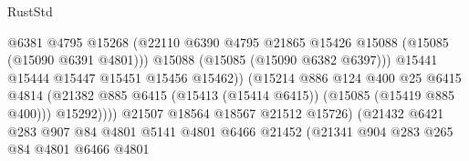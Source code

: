 \begin{lexlean}{RustStd}
\begin{coremodule}
                                              @6381
                                              @4795
                                              @15268
                                              (@22110
                                                @6390
                                                @4795
                                                @21865
                                                @15426
                                                @15088
                                                (@15085 (@15090 @6391 @4801)))
                                              @15088
                                              (@15085 (@15090 @6382 @6397)))
                                            @15441
                                            @15444
                                            @15447
                                            @15451
                                            @15456
                                            @15462))
                                        (@15214
                                          @886
                                          @124
                                          @400
                                          @25
                                          @6415
                                          @4814
                                          (@21382
                                            @885
                                            @6415
                                            (@15413 (@15414 @6415))
                                            (@15085 (@15419 @885 @400)))
                                          @15292))))
                                  @21507
                                  @18564
                                  @18567
                                  @21512
                                  @15726)
                                (@21432
                                  @6421
                                  @283
                                  @907
                                  @84
                                  @4801
                                  @5141
                                  @4801
                                  @6466
                                  @21452
                                  (@21341
                                    @904
                                    @283
                                    @265
                                    @84
                                    @4801
                                    @6466
                                    @4801

\end{coremodule}
\end{lexlean}
